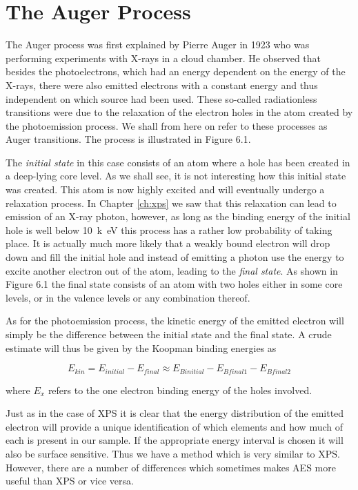 \chapter{The Auger Process}\label{ch:auger}
The Auger process was first explained by  Pierre Auger in 1923 who was performing experiments with X-rays in a cloud chamber. He observed that besides the photoelectrons, which had an energy dependent on the energy of the X-rays, there were also emitted electrons with a constant energy and thus independent on which source had been used. These so-called radiationless transitions were due  to the relaxation of the electron holes in the atom created by the photoemission process. We shall from here on refer to these processes as Auger transitions. The process is illustrated in Figure 6.1.

The {\em initial state} in this case consists of an atom where a hole has been created in a deep-lying core level. As we shall see, it is not interesting how this initial state was created. This atom is now highly excited and will eventually undergo a relaxation process. In Chapter \ref{ch:xps} we saw that this relaxation can lead to emission of an X-ray photon, however, as long as the binding energy of the initial hole is well below \SI{10}{k\electronvolt} this process has a rather low probability of taking place. It is actually much more likely that a  weakly bound electron will drop down and fill the initial hole and instead of emitting a photon use the energy to excite another electron out of the atom, leading to the {\em final state}. As  shown in Figure 6.1 the final state consists of an atom with two holes either in some core levels, or in the  valence  levels or any combination thereof.

As for the photoemission process, the  kinetic energy of the emitted electron will simply be the difference between the initial state and the final state. A crude estimate will thus be given by the Koopman binding energies as

\begin{equation}\label{eq:ekinkoopman}
E_{kin}=E_{initial}-E_{final}\approx E_{B          initial}-E_{Bfinal1}-E_{Bfinal2}
\end{equation}

where $E_x$ refers to the one electron binding energy of the holes involved.

Just as in the case of XPS it is clear that the energy distribution of the emitted electron will provide a unique identification of which elements and how much of each is present in our sample. If the appropriate energy interval is chosen it will also be surface sensitive. Thus we have a method which is very  similar  to XPS. However, there are a number of differences which sometimes makes AES more useful than XPS or vice versa.

